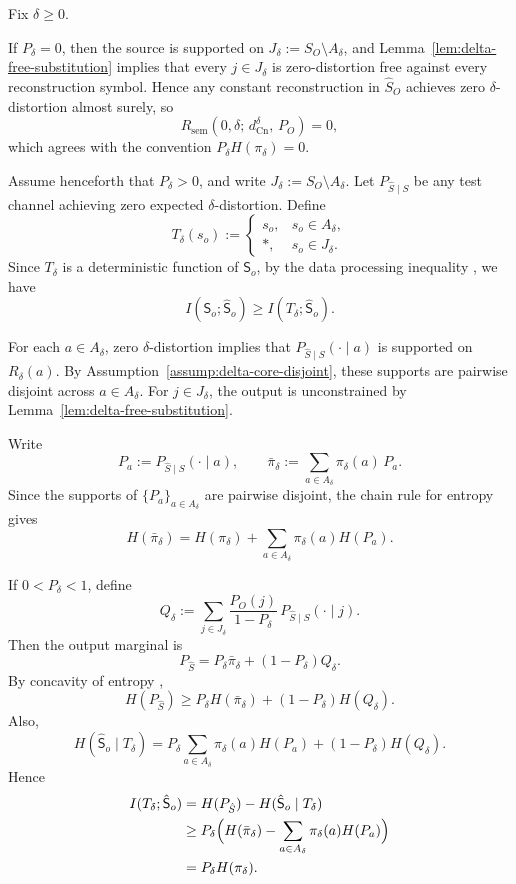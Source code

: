 \documentclass[journal,onecolumn]{IEEEtran}
\makeatletter
\newcommand{\Cn}{\text{Cn}}
\numberwithin{equation}{section}
\renewenvironment{proof}[1][\proofname]{\par
  \pushQED{\qed}%
  \normalfont \topsep6\p@\@plus6\p@\relax
  \trivlist
  \item[\hskip\labelsep
        \itshape
    #1\@addpunct{.}]\ignorespaces
}{%
  \popQED\endtrivlist\@endpefalse
}
\makeatother
\begin{document}
\begin{proof}
Fix \(\delta\ge 0\).

If \(P_\delta=0\), then the source is supported on
\(J_\delta:=S_O\setminus A_\delta\), and
Lemma~\ref{lem:delta-free-substitution} implies that every
\(j\in J_\delta\) is zero-distortion free against every reconstruction
symbol. Hence any constant reconstruction in \(\hat S_O\) achieves
zero \(\delta\)-distortion almost surely, so
\[
  R_{\mathrm{sem}}(0,\delta;\,d_{\Cn}^{\delta},\,P_O)=0,
\]
which agrees with the convention \(P_\delta H(\pi_\delta)=0\).

Assume henceforth that \(P_\delta>0\), and write
\(J_\delta:=S_O\setminus A_\delta\).
Let \(P_{\hat S\mid S}\) be any test channel achieving zero expected
\(\delta\)-distortion. Define
\[
  T_\delta(s_o)
  :=
  \begin{cases}
    s_o, & s_o\in A_\delta,\\
    *,   & s_o\in J_\delta.
  \end{cases}
\]
Since \(T_\delta\) is a deterministic function of \({\mathsf{S}}_o\),
by the data processing inequality \cite[Ch.~2]{cover2006elements}, we have
\[
  I({\mathsf{S}}_o;\hat {\mathsf{S}}_o)\ge I(T_\delta;\hat {\mathsf{S}}_o).
\]

For each \(a\in A_\delta\), zero \(\delta\)-distortion implies that
\(P_{\hat S\mid S}(\cdot\mid a)\) is supported on \(R_\delta(a)\).
By Assumption~\ref{assump:delta-core-disjoint}, these supports are
pairwise disjoint across \(a\in A_\delta\).
For \(j\in J_\delta\), the output is unconstrained by
Lemma~\ref{lem:delta-free-substitution}.

Write
\[
  P_a:=P_{\hat S\mid S}(\cdot\mid a),
  \qquad
  \bar\pi_\delta:=\sum_{a\in A_\delta}\pi_\delta(a)\,P_a.
\]
Since the supports of \(\{P_a\}_{a\in A_\delta}\) are pairwise
disjoint, the chain rule for entropy \cite[Ch.~2]{cover2006elements}\cite[Ch.~3]{csiszar2011information} gives
\[
  H(\bar\pi_\delta)
  =
  H(\pi_\delta)+
  \sum_{a\in A_\delta}\pi_\delta(a)H(P_a).
\]

If \(0<P_\delta<1\), define
\[
  Q_\delta
  :=
  \sum_{j\in J_\delta}\frac{P_O(j)}{1-P_\delta}\,
  P_{\hat S\mid S}(\cdot\mid j).
\]
Then the output marginal is
\[
  P_{\hat S}
  =
  P_\delta \bar\pi_\delta + (1-P_\delta)Q_\delta.
\]
By concavity of entropy \cite[Ch.~2]{cover2006elements}\cite[Ch.~3]{csiszar2011information},
\[
  H(P_{\hat S})
  \ge
  P_\delta H(\bar\pi_\delta)+(1-P_\delta)H(Q_\delta).
\]
Also,
\[
  H(\hat {\mathsf{S}}_o\mid T_\delta)
  =
  P_\delta\sum_{a\in A_\delta}\pi_\delta(a)H(P_a)
  +(1-P_\delta)H(Q_\delta).
\]
Hence
\begin{align*}
  I(T_\delta;\hat {\mathsf{S}}_o)
  &=
  H(P_{\hat S})-H(\hat {\mathsf{S}}_o\mid T_\delta) \\
  &\ge
  P_\delta\Bigl(
    H(\bar\pi_\delta)-
    \sum_{a\in A_\delta}\pi_\delta(a)H(P_a)
  \Bigr) \\
  &=
  P_\delta H(\pi_\delta).
\end{align*}


\end{proof}
\end{document}
